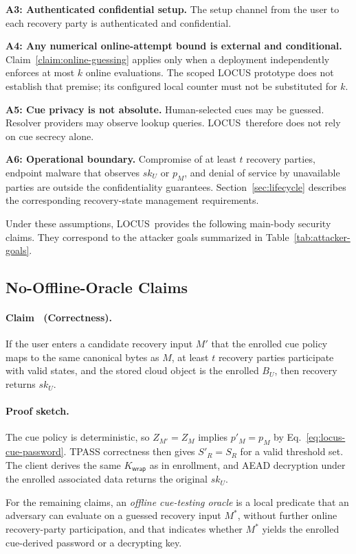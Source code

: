 \documentclass[sigconf,anonymous]{acmart}
\newcommand{\LOCUS}{\textsf{LOCUS}}
\newcounter{locusclaim}
\newcommand{\locusclaim}[1]{\refstepcounter{locusclaim}\paragraph{Claim \thelocusclaim\ (#1).}}
\newcommand{\proofsketch}{\paragraph{Proof sketch.}}
\begin{document}
\textbf{A3: Authenticated confidential setup.}
The setup channel from the user to each recovery party is authenticated and confidential.

\textbf{A4: Any numerical online-attempt bound is external and conditional.}
Claim~\ref{claim:online-guessing} applies only when a deployment independently enforces at most \(k\) online evaluations. The scoped LOCUS prototype does not establish that premise; its configured local counter must not be substituted for \(k\).

\textbf{A5: Cue privacy is not absolute.}
Human-selected cues may be guessed. Resolver providers may observe lookup queries. \LOCUS\ therefore does not rely on cue secrecy alone.

\textbf{A6: Operational boundary.}
Compromise of at least \(t\) recovery parties, endpoint malware that observes \(sk_U\) or \(p_M\), and denial of service by unavailable parties are outside the confidentiality guarantees. Section~\ref{sec:lifecycle} describes the corresponding recovery-state management requirements.

Under these assumptions, \LOCUS\ provides the following main-body security claims. They correspond to the attacker goals summarized in Table~\ref{tab:attacker-goals}.

\subsection{No-Offline-Oracle Claims}
\label{subsec:oracle-boundaries}

\locusclaim{Correctness}
\label{claim:correctness}
If the user enters a candidate recovery input \(M'\) that the enrolled cue policy maps to the same canonical bytes as \(M\), at least \(t\) recovery parties participate with valid states, and the stored cloud object is the enrolled \(B_U\), then recovery returns \(sk_U\).

\proofsketch
The cue policy is deterministic, so \(Z_{M'}=Z_M\) implies \(p'_M=p_M\) by Eq.~\eqref{eq:locus-cue-password}. TPASS correctness then gives \(S'_R=S_R\) for a valid threshold set. The client derives the same \(K_{\mathsf{wrap}}\) as in enrollment, and AEAD decryption under the enrolled associated data returns the original \(sk_U\).

For the remaining claims, an \emph{offline cue-testing oracle} is a local predicate that an adversary can evaluate on a guessed recovery input \(M^\ast\), without further online recovery-party participation, and that indicates whether \(M^\ast\) yields the enrolled cue-derived password or a decrypting key.
\end{document}
